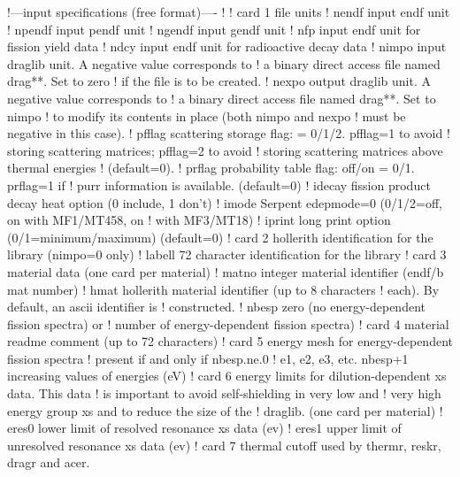 \small
\begin{ccode}

   !---input specifications (free format)----
   !
   ! card 1 file units
   !   nendf     input endf unit
   !   npendf    input pendf unit
   !   ngendf    input gendf unit
   !   nfp       input endf unit for fission yield data
   !   ndcy      input endf unit for radioactive decay data
   !   nimpo     input draglib unit. A negative value corresponds to
   !             a binary direct access file named drag**. Set to zero
   !             if the file is to be created.
   !   nexpo     output draglib unit. A negative value corresponds to
   !             a binary direct access file named drag**. Set to nimpo
   !             to modify its contents in place (both nimpo and nexpo
   !             must be negative in this case).
   !   pfflag    scattering storage flag: = 0/1/2. pfflag=1 to avoid
   !             storing scattering matrices; pfflag=2 to avoid
   !             storing scattering matrices above thermal energies
   !             (default=0).
   !   prflag    probability table flag: off/on = 0/1. prflag=1 if
   !             purr information is available. (default=0)
   !   idecay    fission product decay heat option (0 include, 1 don't)
   !   imode     Serpent edepmode=0 (0/1/2=off, on with MF1/MT458, on
   !             with MF3/MT18)
   !   iprint    long print option (0/1=minimum/maximum) (default=0)
   ! card 2 hollerith identification for the library (nimpo=0 only)
   !   labell    72 character identification for the library
   ! card 3 material data (one card per material)
   !   matno     integer material identifier (endf/b mat number)
   !   hmat      hollerith material identifier (up to 8 characters
   !             each). By default, an ascii identifier is
   !             constructed.
   !   nbesp     zero (no energy-dependent fission spectra) or
   !             number of energy-dependent fission spectra)
   ! card 4 material readme comment (up to 72 characters)
   ! card 5 energy mesh for energy-dependent fission spectra
   ! present if and only if nbesp.ne.0
   !   e1, e2, e3, etc. nbesp+1 increasing values of energies (eV)
   ! card 6 energy limits for dilution-dependent xs data. This data
   !        is important to avoid self-shielding in very low and
   !        very high energy group xs and to reduce the size of the
   !        draglib. (one card per material)
   !   eres0     lower limit of resolved resonance xs data (ev)
   !   eres1     upper limit of unresolved resonance xs data (ev)
   ! card 7 thermal cutoff used by thermr, reskr, dragr and acer.

\end{ccode}
